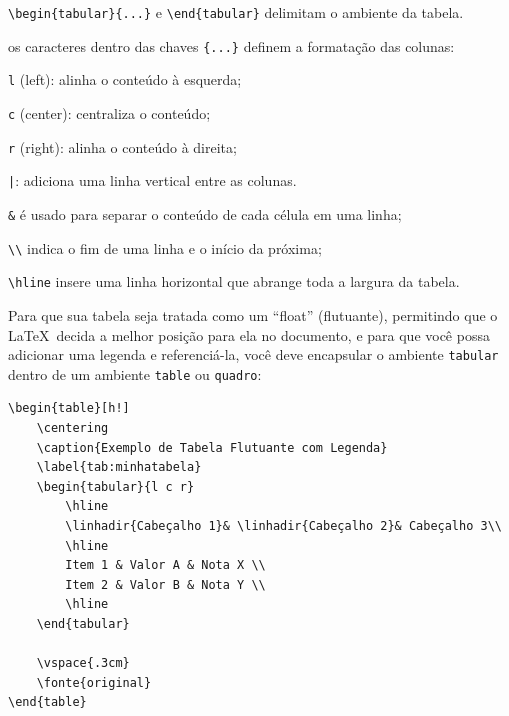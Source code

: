 \begin{alineas}
	\item \texttt{\textbackslash begin\{tabular\}\{...\}} e \texttt{\textbackslash end\{tabular\}} delimitam o ambiente da tabela.
	\item os caracteres dentro das chaves \texttt{\{...\}} definem a formatação das colunas:
	\begin{alineas}
		\item \texttt{l} (left): alinha o conteúdo à esquerda;
		\item \texttt{c} (center): centraliza o conteúdo;
		\item \texttt{r} (right): alinha o conteúdo à direita;
		\item \texttt{|}: adiciona uma linha vertical entre as colunas.
	\end{alineas}
	\item \texttt{\&} é usado para separar o conteúdo de cada célula em uma linha;
	\item \texttt{\textbackslash\textbackslash} indica o fim de uma linha e o início da próxima;
	\item \texttt{\textbackslash hline} insere uma linha horizontal que abrange toda a largura da tabela.
\end{alineas}

\vspace{\baselineskip}

Para que sua tabela seja tratada como um ``float'' (flutuante), permitindo que o \LaTeX\  decida a melhor posição para ela no documento, e para que você possa adicionar uma legenda e referenciá-la, você deve encapsular o ambiente \texttt{tabular} dentro de um ambiente \texttt{table} ou \texttt{quadro}:

\begin{lstlisting}[language={[LaTeX]TeX}]
\begin{table}[h!]
	\centering
	\caption{Exemplo de Tabela Flutuante com Legenda}
	\label{tab:minhatabela}
	\begin{tabular}{l c r}
		\hline
		\linhadir{Cabeçalho 1}& \linhadir{Cabeçalho 2}& Cabeçalho 3\\
		\hline
		Item 1 & Valor A & Nota X \\
		Item 2 & Valor B & Nota Y \\
		\hline
	\end{tabular}

	\vspace{.3cm}
	\fonte{original}
\end{table}
\end{lstlisting}

